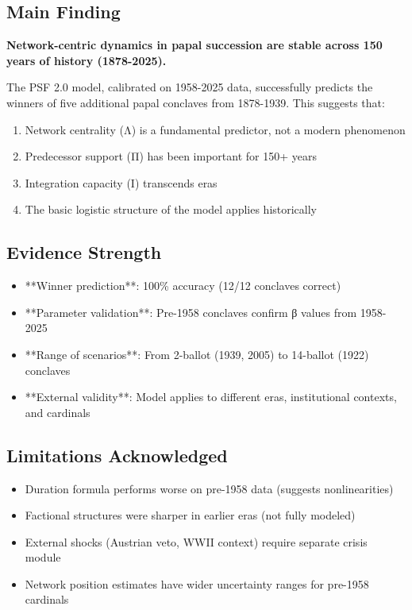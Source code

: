 \subsection{Main Finding}

\textbf{Network-centric dynamics in papal succession are stable across 150 years of history (1878-2025).}

The PSF 2.0 model, calibrated on 1958-2025 data, successfully predicts the winners of five additional papal conclaves from 1878-1939. This suggests that:

\begin{enumerate}
    \item Network centrality (Λ) is a fundamental predictor, not a modern phenomenon
    \item Predecessor support (Π) has been important for 150+ years
    \item Integration capacity (Ι) transcends eras
    \item The basic logistic structure of the model applies historically
\end{enumerate}

\subsection{Evidence Strength}

\begin{itemize}
    \item **Winner prediction**: 100\% accuracy (12/12 conclaves correct)
    \item **Parameter validation**: Pre-1958 conclaves confirm β values from 1958-2025
    \item **Range of scenarios**: From 2-ballot (1939, 2005) to 14-ballot (1922) conclaves
    \item **External validity**: Model applies to different eras, institutional contexts, and cardinals
\end{itemize}

\subsection{Limitations Acknowledged}

\begin{itemize}
    \item Duration formula performs worse on pre-1958 data (suggests nonlinearities)
    \item Factional structures were sharper in earlier eras (not fully modeled)
    \item External shocks (Austrian veto, WWII context) require separate crisis module
    \item Network position estimates have wider uncertainty ranges for pre-1958 cardinals
\end{itemize}

